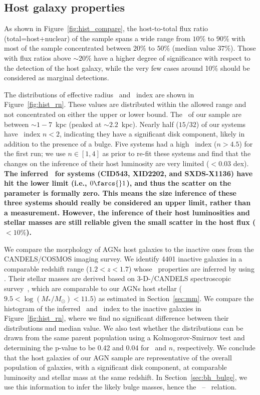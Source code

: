 \documentclass[apj]{emulateapj}
\begin{document}
\subsection{Host galaxy properties}
\label{sec:result-hosts}
As shown in Figure~\ref{fig:hist_compare}, the host-to-total flux ratio (total=host+nuclear) of the sample spans a wide range from $10\%$ to $90\%$ with most of the sample concentrated between $20\%$ to $50\%$ (median value $37\%$). Those with flux ratios above $\sim20\%$ have a higher degree of significance with respect to the detection of the host galaxy, while the very few cases around 10\% should be considered as marginal detections. 

The distributions of effective radius \Reff\ and \sersic\ index are shown in Figure~\ref{fig:hist_rn}. These values are distributed within the allowed range and not concentrated on either the upper or lower bound. The \Reff\ of our sample are between $\sim1-7$~kpc (peaked at $\sim2.2$~kpc). Nearly half ($15/32$) of our systems have \sersic\ index $n<2$, indicating they have a significant disk component, likely in addition to the presence of a bulge. Five systems had a high \sersic\ index ($n>4.5$) for the first run; we use $n\in[1,4]$ as prior to re-fit these systems and find that the changes on the inference of their host luminosity are very limited ($<0.03$ dex). {\bf The inferred \Reff\ for systems (CID543, XID2202, and SXDS-X1136) have hit the lower limit (i.e., $0\farcs{}1$), and thus the scatter on the parameter is formally zero. This means the size inference of these three systems should really be considered an upper limit, rather than a measurement. However, the inference of their host luminosities and stellar masses are still reliable given the small scatter in the host flux ($<10\%$).}

We compare the morphology of AGNs host galaxies to the inactive ones from the CANDELS/COSMOS imaging survey. We identify 4401 inactive galaxies in a comparable redshift range ($1.2<z<1.7$) whose \sersic\ properties are inferred by \citet{VDwel++2012} using \galfit. Their stellar masses are derived based on 3-D-\hst/CANDELS spectroscopic survey~\citep{Momcheva2016, Brammer2012}, which are comparable to our AGNs host stellar ($9.5< \log (M_* /M_{\odot})< 11.5$) as estimated in Section~\ref{sec:mm}. We compare the histogram of the inferred \Reff\ and \sersic\ index to the inactive galaxies in Figure~\ref{fig:hist_rn}, where we find no significant difference between their distributions and median value. We also test whether the distributions can be drawn from the same parent population using a Kolmogorov-Smirnov test and determining the p-value to be 0.42 and 0.04 for \Reff\ and $n$, respectively. We conclude that the host galaxies of our AGN sample are representative of the overall population of galaxies, with a significant disk component, at comparable luminosity and stellar mass at the same redshift. In Section~\ref{sec:bh_bulge}, we use this information to infer the likely bulge masses, hence the \mbh\ -- \bmass\ relation.
\end{document}
